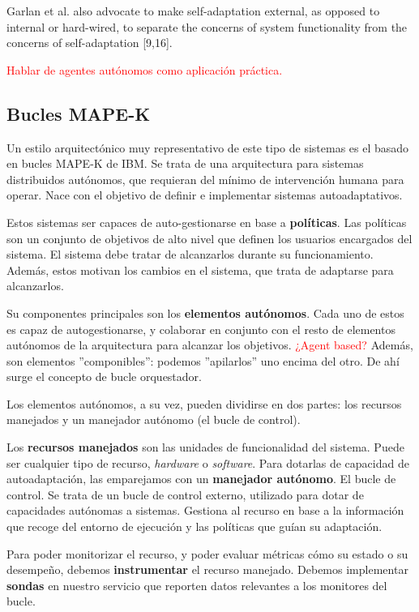 Garlan et al. also advocate to make self-adaptation external, as opposed to internal or hard-wired, to separate the concerns of system
functionality from the concerns of self-adaptation [9,16].

\textcolor{red}{Hablar de agentes autónomos como aplicación práctica. \cite{savaglioAgentbasedInternetThings2020}}

\subsection{Bucles MAPE-K}

Un estilo arquitectónico muy representativo de este tipo de sistemas es el basado en bucles MAPE-K \cite{ibmcorporationArchitecturalBlueprintAutonomic2006, fonsServiciosAdaptivereadyPara2021} de IBM. Se trata de una arquitectura para sistemas distribuidos autónomos, que requieran del mínimo de intervención humana para operar. Nace con el objetivo de definir e implementar sistemas autoadaptativos.

Estos sistemas ser capaces de auto-gestionarse en base a \textbf{políticas}. Las políticas son un conjunto de objetivos de alto nivel que definen los usuarios encargados del sistema. El sistema debe tratar de alcanzarlos durante su funcionamiento. Además, estos motivan los cambios en el sistema, que trata de adaptarse para alcanzarlos.

Su componentes principales son los \textbf{elementos autónomos}. Cada uno de estos es capaz de autogestionarse, y colaborar en conjunto con el resto de elementos autónomos de la arquitectura para alcanzar los objetivos. \textcolor{red}{¿Agent based?} Además, son elementos ''componibles'': podemos ''apilarlos'' uno encima del otro. De ahí surge el concepto de bucle orquestador.

Los elementos autónomos, a su vez, pueden dividirse en dos partes: los recursos manejados y un manejador autónomo (el bucle de control).

Los \textbf{recursos manejados} son las unidades de funcionalidad del sistema. Puede ser cualquier tipo de recurso, \emph{hardware} o \emph{software}. Para dotarlas de capacidad de autoadaptación, las emparejamos con un \textbf{manejador autónomo}. El bucle de control. Se trata de un bucle de control externo, utilizado para dotar de capacidades autónomas a sistemas. Gestiona al recurso en base a la información que recoge del entorno de ejecución y las políticas que guían su adaptación.

Para poder monitorizar el recurso, y poder evaluar métricas cómo su estado o su desempeño, debemos \textbf{instrumentar} el recurso manejado. Debemos implementar \textbf{sondas} en nuestro servicio que reporten datos relevantes a los monitores del bucle.

